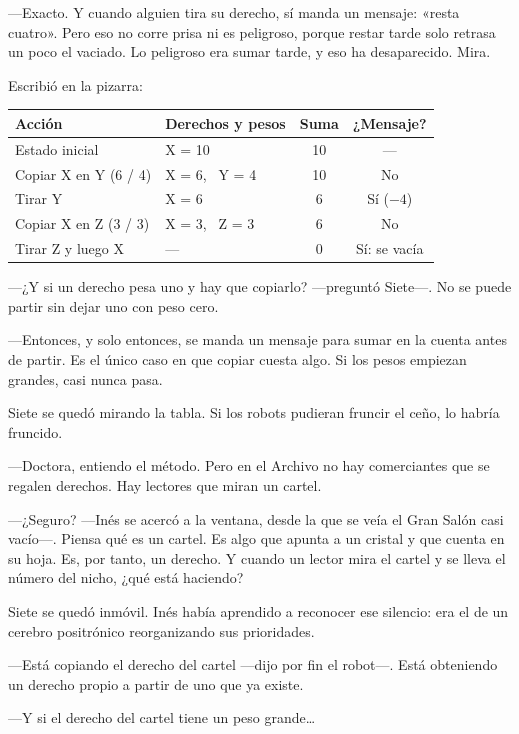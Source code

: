 ---Exacto. Y cuando alguien tira su derecho, sí manda un mensaje: «resta cuatro». Pero eso no corre prisa ni es peligroso, porque restar tarde solo retrasa un poco el vaciado. Lo peligroso era sumar tarde, y eso ha desaparecido. Mira.

Escribió en la pizarra:

\begin{pizarra}
\begin{tabular}{@{}l l c c@{}}
\toprule
\textbf{Acción} & \textbf{Derechos y pesos} & \textbf{Suma} & \textbf{¿Mensaje?} \\
\midrule
Estado inicial & X = 10 & 10 & --- \\
Copiar X en Y (6 / 4) & X = 6, \ Y = 4 & 10 & No \\
Tirar Y & X = 6 & 6 & Sí ($-4$) \\
Copiar X en Z (3 / 3) & X = 3, \ Z = 3 & 6 & No \\
Tirar Z y luego X & --- & 0 & Sí: se vacía \\
\bottomrule
\end{tabular}
\end{pizarra}

---¿Y si un derecho pesa uno y hay que copiarlo? ---preguntó Siete---\nobreak. No se puede partir sin dejar uno con peso cero.

---Entonces, y solo entonces, se manda un mensaje para sumar en la cuenta antes de partir. Es el único caso en que copiar cuesta algo. Si los pesos empiezan grandes, casi nunca pasa.

\escena
Siete se quedó mirando la tabla. Si los robots pudieran fruncir el ceño, lo habría fruncido.

---Doctora, entiendo el método. Pero en el Archivo no hay comerciantes que se regalen derechos. Hay lectores que miran un cartel.

---¿Seguro? ---Inés se acercó a la ventana, desde la que se veía el Gran Salón casi vacío---\nobreak. Piensa qué es un cartel. Es algo que apunta a un cristal y que cuenta en su hoja. Es, por tanto, un derecho. Y cuando un lector mira el cartel y se lleva el número del nicho, ¿qué está haciendo?

Siete se quedó inmóvil. Inés había aprendido a reconocer ese silencio: era el de un cerebro positrónico reorganizando sus prioridades.

---Está copiando el derecho del cartel ---dijo por fin el robot---\nobreak. Está obteniendo un derecho propio a partir de uno que ya existe.

---Y si el derecho del cartel tiene un peso grande\ldots


